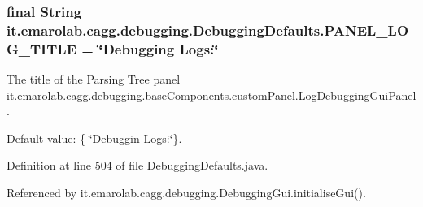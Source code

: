 \hypertarget{classit_1_1emarolab_1_1cagg_1_1debugging_1_1DebuggingDefaults_a0ee291f44dda35a1de8d5b01d8a06470}{
\subsubsection[{P\-A\-N\-E\-L\-\_\-\-L\-O\-G\-\_\-\-T\-I\-T\-L\-E}]{\setlength{\rightskip}{0pt plus 5cm}final String it.\-emarolab.\-cagg.\-debugging.\-Debugging\-Defaults.\-P\-A\-N\-E\-L\-\_\-\-L\-O\-G\-\_\-\-T\-I\-T\-L\-E = \char`\"{}Debugging Logs\-:\char`\"{}\hspace{0.3cm}{\ttfamily [static]}}}\label{classit_1_1emarolab_1_1cagg_1_1debugging_1_1DebuggingDefaults_a0ee291f44dda35a1de8d5b01d8a06470}
The title of the Parsing Tree panel \hyperlink{classit_1_1emarolab_1_1cagg_1_1debugging_1_1baseComponents_1_1customPanel_1_1LogDebuggingGuiPanel}{it.\-emarolab.\-cagg.\-debugging.\-base\-Components.\-custom\-Panel.\-Log\-Debugging\-Gui\-Panel}.\par
 Default value\-: \{ \char`\"{}\-Debuggin Logs\-:\char`\"{}\}. 

Definition at line 504 of file Debugging\-Defaults.\-java.



Referenced by it.\-emarolab.\-cagg.\-debugging.\-Debugging\-Gui.\-initialise\-Gui().

